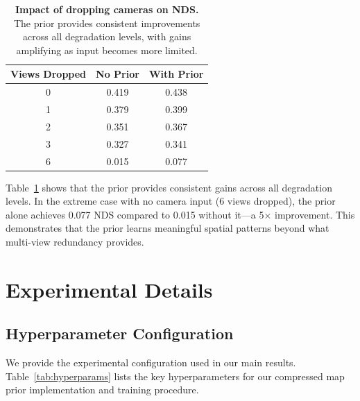 \documentclass{article} %
\begin{document}
\begin{table}[h]
\centering
\begin{tabular}{ccc}
\toprule
Views Dropped & No Prior & With Prior \\
\midrule
0 & 0.419 & 0.438 \\
1 & 0.379 & 0.399 \\
2 & 0.351 & 0.367 \\
3 & 0.327 & 0.341 \\
6 & 0.015 & 0.077 \\
\bottomrule
\end{tabular}
\caption{\textbf{Impact of dropping cameras on NDS.} The prior provides consistent improvements across all degradation levels, with gains amplifying as input becomes more limited.}
\label{tab:camera_drop}
\end{table}

Table~\ref{tab:camera_drop} shows that the prior provides consistent gains across all degradation levels.
In the extreme case with no camera input (6 views dropped), the prior alone achieves 0.077 NDS compared to 0.015 without it---a 5$\times$ improvement.
This demonstrates that the prior learns meaningful spatial patterns beyond what multi-view redundancy provides.

\section{Experimental Details}

\subsection{Hyperparameter Configuration}
We provide the experimental configuration used in our main results. Table~\ref{tab:hyperparams} lists the key hyperparameters for our compressed map prior implementation and training procedure.
\end{document}
